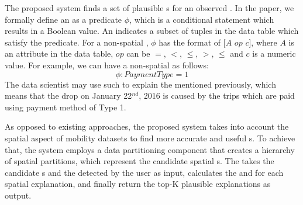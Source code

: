 The proposed system finds a set of plausible {\explanation}s for an observed {\fact}. In the paper, we formally define an {\explanation} as a predicate $\phi$, which is a conditional statement which results in a Boolean value. An {\explanation} indicates a subset of tuples in the data table which satisfy the predicate. For a non-spatial {\explanation}, $\phi$ has the format of $[A$ $op$ $c]$, where $A$ is an attribute in the data table, $op$ can be $=$, $<$, $\leq$, $>$, $\leq$ and $c$ is a numeric value. For example, we can have a non-spatial {\explanation} as follows:
$$\phi: PaymentType = 1$$
The data scientist may use such {\explanation} to explain the {\fact} mentioned previously, which means that the drop on January 22$^{nd}$, 2016 is caused by the trips which are paid using payment method of Type 1.


As opposed to existing approaches, the proposed system takes into account the spatial aspect of mobility datasets to find more accurate and useful {\explanation}s.
To achieve that, the system employs a data partitioning component that creates a hierarchy of spatial partitions, which represent the candidate spatial {\explanation}s. %
The {\evaluator} takes the candidate {\explanation}s and the {\fact} detected by the user as input, calculates the {\intensity} and {\influence} for each spatial explanation, and finally return the top-K plausible explanations as output.




